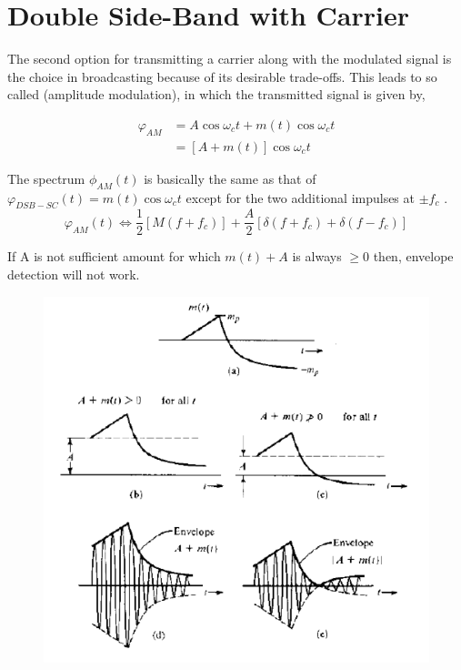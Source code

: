 \section{Double Side-Band with Carrier}
The second option for transmitting a carrier along with the modulated signal is
the choice in broadcasting because of its desirable trade-offs. This leads to so called (amplitude modulation), in which the transmitted signal is given by,

\begin{equation}
	\begin{split}
	\varphi_{AM} & =A\cos{\omega_ct}+m(t)\cos{\omega_ct} \\
	 & =[A+m(t)]\cos{\omega_ct} 
	\end{split}
\end{equation}

The spectrum $\phi_{AM}(t)$ is basically the same as that of $\varphi_{DSB-SC}(t)=m(t)\cos{\omega_ct}$ except for the two
additional impulses at $\pm f_c$ .
\begin{equation}
	\varphi_{AM}(t) \Leftrightarrow \frac{1}{2}[M(f+f_c)]+\frac{A}{2}[\delta(f+f_c)+\delta(f-f_c)]
\end{equation}

If A is not sufficient amount for which $m(t)+A$ is always $\geq 0$ then, envelope detection will not work.

\begin{figure}[H]
	\centering
	\includegraphics[]{Capture4.PNG}
\end{figure}

